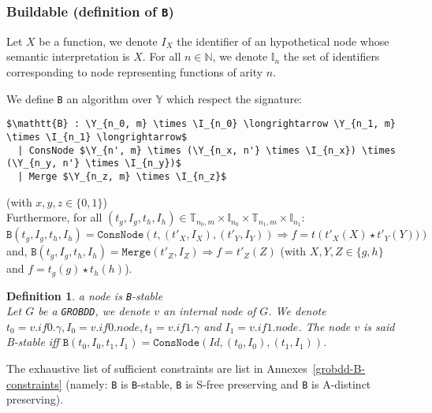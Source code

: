 \documentclass[a4paper,10pt]{article}
\newcommand{\N}{\mathbb{N}}%
\newcommand{\Y}{\mathbb{Y}}
\newcommand{\I}{\mathbb{I}}
\newcommand{\T}{\mathbb{T}}
\newcommand{\GroBdd}{\texttt{GROBDD}}
\newtheorem{newdef}{Definition}
\newcommand{\definition}[2]{\begin{newdef}{#1\\}#2\end{newdef}}
\begin{document}
\subsubsection{Buildable (definition of \texttt{B})}

Let $X$ be a function, we denote $I_X$ the identifier of an hypothetical node whose semantic interpretation is $X$.
For all $n\in\N$, we denote $\I_n$ the set of identifiers corresponding to node representing functions of arity $n$.

We define \texttt{B} an algorithm over $\Y$ which respect the signature:
\begin{lstlisting}
$\mathtt{B} : \Y_{n_0, m} \times \I_{n_0} \longrightarrow \Y_{n_1, m} \times \I_{n_1} \longrightarrow$
  | ConsNode $\Y_{n', m} \times (\Y_{n_x, n'} \times \I_{n_x}) \times (\Y_{n_y, n'} \times \I_{n_y})$
  | Merge $\Y_{n_z, m} \times \I_{n_z}$
\end{lstlisting}
(with $x, y, z \in \{0, 1\}$) \\
Furthermore, for all $(t_g, I_g, t_h, I_h) \in \T_{n_0, m} \times \I_{n_0} \times \T_{n_1, m} \times \I_{n_1}$:
$\texttt{B}(t_g, I_g, t_h, I_h) = \texttt{ConsNode} (t, (t'_X, I_X), (t'_Y, I_Y)) \Rightarrow f = t\left(t'_X(X) \star t'_Y(Y))\right)$
and, $\texttt{B}(t_g, I_g, t_h, I_h) = \texttt{Merge} (t'_Z, I_Z) \Rightarrow f = t'_Z(Z)$ (with $X, Y, Z \in\{g, h\}$ and $f = t_g(g) \star t_h(h)$).

\definition{a node is \texttt{B}-stable}
{
Let $G$ be a \GroBdd{}, we denote $v$ an internal node of $G$.
We denote $t_0 = v.if0.\gamma, I_0 = v.if0.node, t_1 = v.if1.\gamma$ and $I_1 = v.if1.node$.
The node $v$ is said B-stable iff $\mathtt{B}(t_0, I_0, t_1, I_1) = \mathtt{ConsNode}(Id, (t_0, I_0), (t_1, I_1))$.
}

The exhaustive list of sufficient constraints are list in Annexes~\ref{grobdd-B-constraints} (namely: \texttt{B} is \texttt{B}-stable, \texttt{B} is S-free preserving and \texttt{B} is A-distinct preserving).
\end{document}
